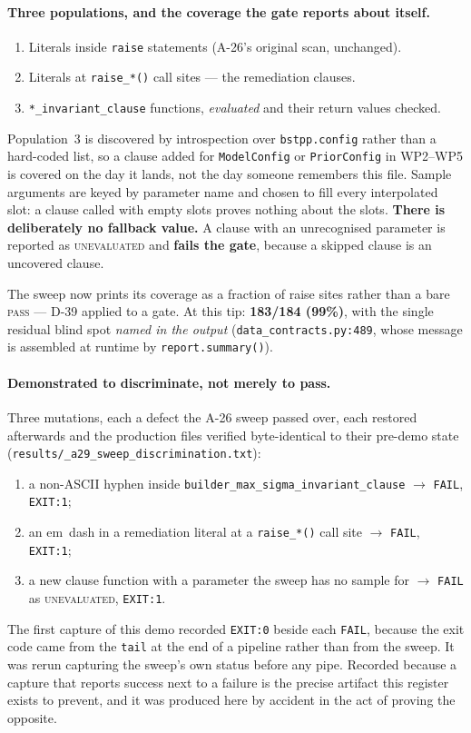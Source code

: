 \documentclass[
  10pt,
]{article}
\providecommand{\tightlist}{%
  \setlength{\itemsep}{0pt}\setlength{\parskip}{0pt}}
\begin{document}
\paragraph{Three populations, and the coverage the gate reports about itself.}
\begin{enumerate}
\tightlist
\item Literals inside \texttt{raise} statements (A-26's original scan, unchanged).
\item Literals at \texttt{raise\_*()} call sites --- the remediation clauses.
\item \texttt{*\_invariant\_clause} functions, \emph{evaluated} and their return values checked.
\end{enumerate}
Population~3 is discovered by introspection over \texttt{bstpp.config} rather than a hard-coded list, so a clause added for \texttt{ModelConfig} or \texttt{PriorConfig} in WP2--WP5 is covered on the day it lands, not the day someone remembers this file. Sample arguments are keyed by parameter name and chosen to fill every interpolated slot: a clause called with empty slots proves nothing about the slots. \textbf{There is deliberately no fallback value.} A clause with an unrecognised parameter is reported as \textsc{unevaluated} and \textbf{fails the gate}, because a skipped clause is an uncovered clause.

The sweep now prints its coverage as a fraction of raise sites rather than a bare \textsc{pass} --- D-39 applied to a gate. At this tip: \textbf{183/184 (99\%)}, with the single residual blind spot \emph{named in the output} (\texttt{data\_contracts.py:489}, whose message is assembled at runtime by \texttt{report.summary()}).

\paragraph{Demonstrated to discriminate, not merely to pass.}
Three mutations, each a defect the A-26 sweep passed over, each restored afterwards and the production files verified byte-identical to their pre-demo state (\texttt{results/\allowbreak{}\_a29\_sweep\_discrimination.txt}):
\begin{enumerate}
\tightlist
\item a non-ASCII hyphen inside \texttt{builder\_max\_sigma\_invariant\_clause} $\rightarrow$ \texttt{FAIL}, \texttt{EXIT:1};
\item an em~dash in a remediation literal at a \texttt{raise\_*()} call site $\rightarrow$ \texttt{FAIL}, \texttt{EXIT:1};
\item a new clause function with a parameter the sweep has no sample for $\rightarrow$ \texttt{FAIL} as \textsc{unevaluated}, \texttt{EXIT:1}.
\end{enumerate}
The first capture of this demo recorded \texttt{EXIT:0} beside each \texttt{FAIL}, because the exit code came from the \texttt{tail} at the end of a pipeline rather than from the sweep. It was rerun capturing the sweep's own status before any pipe. Recorded because a capture that reports success next to a failure is the precise artifact this register exists to prevent, and it was produced here by accident in the act of proving the opposite.
\end{document}
